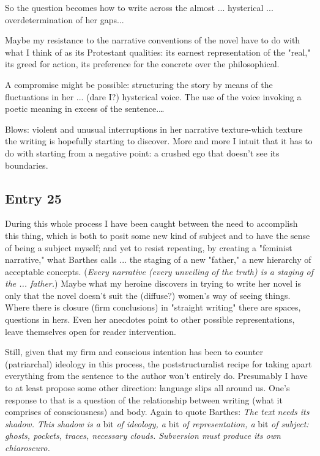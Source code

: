 \documentclass[
]{memoir}
\begin{document}
So the question becomes how to write across the almost ... hysterical
... overdetermination of her gaps...

Maybe my resistance to the narrative conventions of the novel have to do
with what I think of as its Protestant qualities: its earnest
representation of the "real," its greed for action, its preference for
the concrete over the philosophical.

A compromise might be possible: structuring the story by means of the
fluctuations in her ... (dare I?) hysterical voice. The use of the voice
invoking a poetic meaning in excess of the sentence.\ldots{}

Blows: violent and unusual interruptions in her narrative texture-which
texture the writing is hopefully starting to discover. More and more I
intuit that it has to do with starting from a negative point: a crushed
ego that doesn't see its boundaries.

\hypertarget{entry-25}{%
\subsection*{Entry 25}\label{entry-25}}

During this whole process I have been caught between the need to
accomplish this thing, which is both to posit some new kind of subject
and to have the sense of being a subject myself; and yet to resist
repeating, by creating a "feminist narrative," what Barthes calls ...
the staging of a new "father," a new hierarchy of acceptable concepts.
(\emph{Every narrative (every unveiling of the truth) is a staging of
the ... father.}) Maybe what my heroine discovers in trying to write her
novel is only that the novel doesn't suit the (diffuse?) women's way of
seeing things. Where there is closure (firm conclusions) in "straight
writing" there are spaces, questions in hers. Even her anecdotes point
to other possible representations, leave themselves open for reader
intervention.

Still, given that my firm and conscious intention has been to counter
(patriarchal) ideology in this process, the poststructuralist recipe for
taking apart everything from the sentence to the author won't entirely
do. Presumably I have to at least propose some other direction: language
slips all around us. One's response to that is a question of the
relationship between writing (what it comprises of consciousness) and
body. Again to quote Barthes: \emph{The text needs its shadow. This
shadow is a} bit \emph{of ideology, a} bit \emph{of representation, a}
bit \emph{of subject: ghosts, pockets, traces, necessary clouds.
Subversion must produce its own chiaroscuro.}
\end{document}
